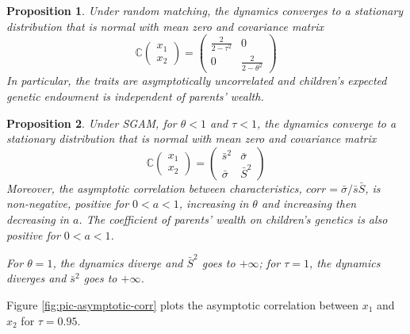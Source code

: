 \documentclass[
]{article}
\newtheorem{proposition}{Proposition}
\theoremstyle{definition}
\theoremstyle{definition}
\theoremstyle{definition}
\theoremstyle{definition}
\theoremstyle{remark}
\begin{document}
\begin{proposition}\label{prop-asymptotics-RM}
Under random matching, the dynamics converges to a stationary distribution that 
is normal with mean zero and covariance matrix 
\[
\mathbb{C}\left(\begin{array}{cc}
x_1  \\
x_2
\end{array}
\right)
=
\left( 
\begin{array}{cc}
\frac{2}{2-\tau ^{2}} & 0 \\ 
0 & \frac{2}{2-\theta ^{2}}%
\end{array}%
\right) \allowbreak 
\]%
In particular, the traits are asymptotically uncorrelated and children's
expected genetic endowment is independent of parents' wealth.

\end{proposition}

\begin{proposition}\label{prop-asymptotics-SGAM}
Under SGAM, for $\theta <1$ and $\tau <1$, the dynamics converge to a stationary
distribution that is normal with mean zero and covariance matrix 
\[
\mathbb{C}\left(\begin{array}{cc}
x_1  \\
x_2
\end{array}
\right)
=
\left(
\begin{array}{cc}
\bar{s}^{2} & \bar{\sigma} \\ 
\bar{\sigma} & \bar{S}^{2}%
\end{array}%
\right) 
\]
Moreover, the asymptotic correlation between characteristics, 
$corr = \bar{\sigma}/\bar{s}\bar{S}$, is non-negative, positive for $0 < a < 1$, 
increasing in $\theta$ and increasing then decreasing in $a$. 
The coefficient of parents' wealth on children's genetics is also positive 
for $0 < a < 1$.

For $\theta = 1$, the dynamics diverge and $\bar{S}^{2}$ goes to $+\infty$; for 
$\tau = 1$, the dynamics diverges and $\bar{s}^{2}$ goes to $+\infty$.

\end{proposition}

Figure \ref{fig:pic-asymptotic-corr} plots the asymptotic correlation
between \(x_1\) and \(x_2\) for \(\tau = 0.95\).
\end{document}
